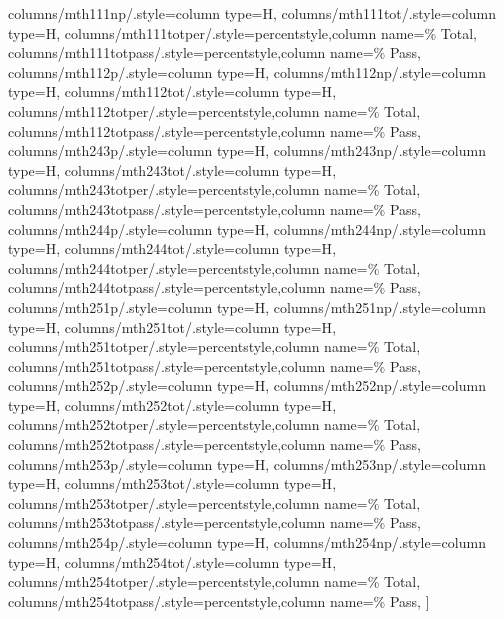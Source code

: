 \documentclass[varwidth]{standalone}
\begin{document}
{    columns/mth111np/.style={column type=H},
    columns/mth111tot/.style={column type=H},
    columns/mth111totper/.style={percentstyle,column name=\% Total},
    columns/mth111totpass/.style={percentstyle,column name=\% Pass},
    columns/mth112p/.style={column type=H},
    columns/mth112np/.style={column type=H},
    columns/mth112tot/.style={column type=H},
    columns/mth112totper/.style={percentstyle,column name=\% Total},
    columns/mth112totpass/.style={percentstyle,column name=\% Pass},
    columns/mth243p/.style={column type=H},
    columns/mth243np/.style={column type=H},
    columns/mth243tot/.style={column type=H},
    columns/mth243totper/.style={percentstyle,column name=\% Total},
    columns/mth243totpass/.style={percentstyle,column name=\% Pass},
    columns/mth244p/.style={column type=H},
    columns/mth244np/.style={column type=H},
    columns/mth244tot/.style={column type=H},
    columns/mth244totper/.style={percentstyle,column name=\% Total},
    columns/mth244totpass/.style={percentstyle,column name=\% Pass},
    columns/mth251p/.style={column type=H},
    columns/mth251np/.style={column type=H},
    columns/mth251tot/.style={column type=H},
    columns/mth251totper/.style={percentstyle,column name=\% Total},
    columns/mth251totpass/.style={percentstyle,column name=\% Pass},
    columns/mth252p/.style={column type=H},
    columns/mth252np/.style={column type=H},
    columns/mth252tot/.style={column type=H},
    columns/mth252totper/.style={percentstyle,column name=\% Total},
    columns/mth252totpass/.style={percentstyle,column name=\% Pass},
    columns/mth253p/.style={column type=H},
    columns/mth253np/.style={column type=H},
    columns/mth253tot/.style={column type=H},
    columns/mth253totper/.style={percentstyle,column name=\% Total},
    columns/mth253totpass/.style={percentstyle,column name=\% Pass},
    columns/mth254p/.style={column type=H},
    columns/mth254np/.style={column type=H},
    columns/mth254tot/.style={column type=H},
    columns/mth254totper/.style={percentstyle,column name=\% Total},
    columns/mth254totpass/.style={percentstyle,column name=\% Pass},
]{\diversitydata}
}
\end{document}
